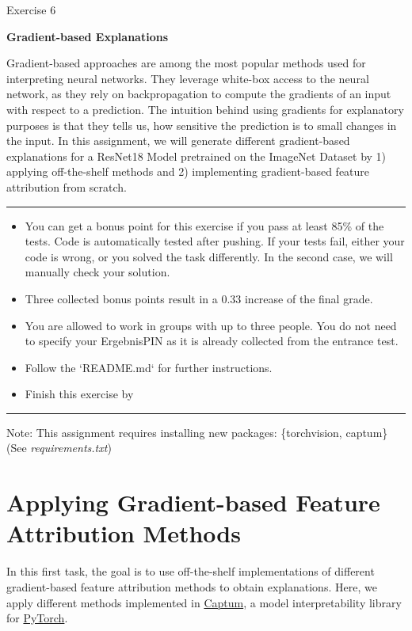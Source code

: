 \documentclass[a4paper]{article}
\begin{document}
{\noindent\LARGE Exercise 6\par}
\vspace{8pt}
{\noindent\huge\textbf{Gradient-based Explanations}}
\vspace{20pt}

\noindent
Gradient-based approaches are among the most popular methods used for interpreting neural networks.
They leverage white-box access to the neural network, as they rely on backpropagation to compute the gradients of an input with respect to a prediction.
The intuition behind using gradients for explanatory purposes is that they tells us, how sensitive the prediction is to small changes in the input.
In this assignment, we will generate different gradient-based explanations for a ResNet18 Model pretrained on the ImageNet Dataset by 1) applying off-the-shelf methods and 2) implementing gradient-based feature attribution from scratch.


\vspace{10pt}
\par\noindent\rule{\textwidth}{0.2pt}
\begin{itemize}
    \item You can get a bonus point for this exercise if you pass at least 85\% of the tests. Code is automatically tested after pushing. If your tests fail, either your code is wrong, or you solved the task differently. In the second case, we will manually check your solution.
    \item Three collected bonus points result in a 0.33 increase of the final grade.
    \item You are allowed to work in groups with up to three people. You do not need to specify your ErgebnisPIN as it is already collected from the entrance test.
    \item Follow the `README.md` for further instructions.
    \item Finish this exercise by \color{red}{24th November, 2021 at 11:59 pm.}
\end{itemize}
\par\noindent\rule{\textwidth}{0.2pt}
\vspace{8pt}

Note: This assignment requires installing new packages: \{torchvision, captum\}  (See \textit{requirements.txt})

\section{Applying Gradient-based Feature Attribution Methods}
In this first task, the goal is to use off-the-shelf implementations of different gradient-based feature attribution methods to obtain explanations.
Here, we apply different methods implemented in \href{https://captum.ai/}{Captum}, a model interpretability library for \href{https://pytorch.org/}{PyTorch}.\\
\end{document}
